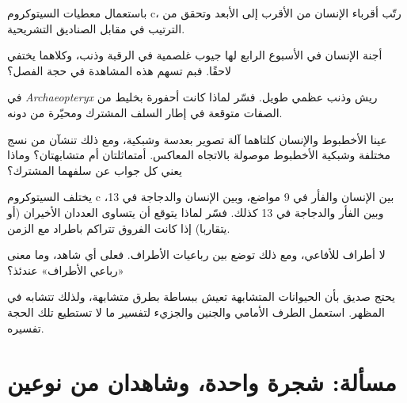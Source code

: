\begin{exercise}[$\star\star$]\label{exo:g10:common-ancestry:9}
باستعمال معطيات السيتوكروم c، رتّب أقرباء الإنسان من الأقرب إلى
الأبعد وتحقق من الترتيب في مقابل الصناديق التشريحية.
\end{exercise}

\begin{exercise}[$\star\star$]\label{exo:g10:common-ancestry:10}
أجنة الإنسان في الأسبوع الرابع لها جيوب غلصمية في الرقبة وذنب،
وكلاهما يختفي لاحقًا. فبم تسهم هذه المشاهدة في حجة الفصل؟
\end{exercise}

\begin{exercise}[$\star\star$]\label{exo:g10:common-ancestry:11}
في \emph{Archaeopteryx} ريش وذنب عظمي طويل. فسّر لماذا كانت أحفورة
بخليط من الصفات متوقعة في إطار السلف المشترك ومحيّرة من دونه.
\end{exercise}

\begin{exercise}[$\star\star\star$]\label{exo:g10:common-ancestry:12}
عينا الأخطبوط والإنسان كلتاهما آلة تصوير بعدسة وشبكية، ومع ذلك تنشآن
من نسج مختلفة وشبكية الأخطبوط موصولة بالاتجاه المعاكس. أمتماثلتان أم
متشابهتان؟ وماذا يعني كل جواب عن سلفهما المشترك؟
\end{exercise}

\begin{exercise}[$\star\star\star$]\label{exo:g10:common-ancestry:13}
يختلف السيتوكروم c بين الإنسان والفأر في 9 مواضع، وبين الإنسان
والدجاجة في 13، وبين الفأر والدجاجة في 13 كذلك. فسّر لماذا يتوقع أن
يتساوى العددان الأخيران (أو يتقاربا) إذا كانت الفروق تتراكم باطراد مع
الزمن.
\end{exercise}

\begin{exercise}[$\star\star\star$]\label{exo:g10:common-ancestry:14}
لا أطراف للأفاعي، ومع ذلك توضع بين رباعيات الأطراف. فعلى أي شاهد، وما
معنى «رباعي الأطراف» عندئذ؟
\end{exercise}

\begin{exercise}[$\star\star\star$]\label{exo:g10:common-ancestry:15}
يحتج صديق بأن الحيوانات المتشابهة تعيش ببساطة بطرق متشابهة، ولذلك
تتشابه في المظهر. استعمل الطرف الأمامي والجنين والجزيء لتفسير ما لا
تستطيع تلك الحجة تفسيره.
\end{exercise}

\section{مسألة: شجرة واحدة، وشاهدان من نوعين}

